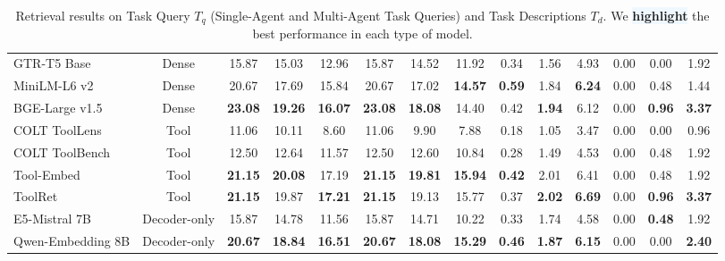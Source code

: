 \documentclass{article} %
\begin{document}
\begin{table}[!t]
{\begin{tabular}{lccccccccccccc}
GTR-T5 Base & Dense & 15.87 & 15.03 & 12.96 & 15.87 & 14.52 & 11.92 & 0.34 & 1.56 & 4.93 & 0.00 & 0.00 & 1.92 \\
MiniLM-L6 v2 & Dense & 20.67 & 17.69 & 15.84 & 20.67 & 17.02 & \cellcolor{aliceblue}\textbf{14.57} & \cellcolor{aliceblue}\textbf{0.59} & 1.84 & \cellcolor{aliceblue}\textbf{6.24} & 0.00 & 0.48 & 1.44 \\
BGE-Large v1.5 & Dense & \cellcolor{aliceblue}\textbf{23.08} & \cellcolor{aliceblue}\textbf{19.26} & \cellcolor{aliceblue}\textbf{16.07} & \cellcolor{aliceblue}\textbf{23.08} & \cellcolor{aliceblue}\textbf{18.08} & 14.40 & 0.42 & \cellcolor{aliceblue}\textbf{1.94} & 6.12 & 0.00 & \cellcolor{aliceblue}\textbf{0.96} & \cellcolor{aliceblue}\textbf{3.37} \\
\hline
COLT ToolLens & Tool & 11.06 & 10.11 & 8.60 & 11.06 & 9.90 & 7.88 & 0.18 & 1.05 & 3.47 & 0.00 & 0.00 & 0.96 \\
COLT ToolBench & Tool & 12.50 & 12.64 & 11.57 & 12.50 & 12.60 & 10.84 & 0.28 & 1.49 & 4.53 & 0.00 & 0.48 & 1.92 \\
Tool-Embed & Tool & \cellcolor{aliceblue}\textbf{21.15} & \cellcolor{aliceblue}\textbf{20.08} & 17.19 & \cellcolor{aliceblue}\textbf{21.15} & \cellcolor{aliceblue}\textbf{19.81} & \cellcolor{aliceblue}\textbf{15.94} & \cellcolor{aliceblue}\textbf{0.42} & 2.01 & 6.41 & 0.00 & 0.48 & 1.92 \\
ToolRet & Tool & \cellcolor{aliceblue}\textbf{21.15} & 19.87 & \cellcolor{aliceblue}\textbf{17.21} & \cellcolor{aliceblue}\textbf{21.15} & 19.13 & 15.77 & 0.37 & \cellcolor{aliceblue}\textbf{2.02} & \cellcolor{aliceblue}\textbf{6.69} & 0.00 & \cellcolor{aliceblue}\textbf{0.96} & \cellcolor{aliceblue}\textbf{3.37} \\
\hline
E5-Mistral 7B & Decoder-only & 15.87 & 14.78 & 11.56 & 15.87 & 14.71 & 10.22 & 0.33 & 1.74 & 4.58 & 0.00 & \cellcolor{aliceblue}\textbf{0.48} & 1.92 \\
Qwen-Embedding 8B & Decoder-only & \cellcolor{aliceblue}\textbf{20.67} & \cellcolor{aliceblue}\textbf{18.84} & \cellcolor{aliceblue}\textbf{16.51} & \cellcolor{aliceblue}\textbf{20.67} & \cellcolor{aliceblue}\textbf{18.08} & \cellcolor{aliceblue}\textbf{15.29} & \cellcolor{aliceblue}\textbf{0.46} & \cellcolor{aliceblue}\textbf{1.87} & \cellcolor{aliceblue}\textbf{6.15} & 0.00 & 0.00 & \cellcolor{aliceblue}\textbf{2.40} \\
\bottomrule
\end{tabular}%
}
\caption{Retrieval results on Task Query $T_q$ (Single-Agent and Multi-Agent Task Queries) and Task Descriptions $T_d$. We \colorbox{aliceblue}{\textbf{highlight}} the best performance in each type of model.}
\label{tab:retrieval}
\end{table}
\end{document}
